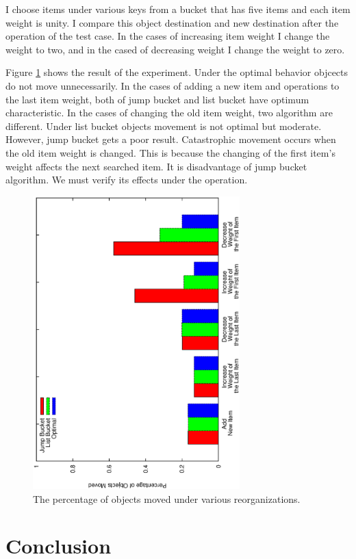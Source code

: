 \documentclass[a4paper,11pt]{article}
\begin{document}
I choose items under various keys from a bucket that has five items and each item weight is unity.
I compare this object destination and new destination after the operation of the test case. In the cases of increasing item weight I change the weight to two, and in the cased of decreasing weight I change the weight to zero.

Figure \ref{reorganize} shows the result of the experiment.
Under the optimal behavior objcects do not move unnecessarily.
In the cases of adding a new item and operations to the last item weight, both of jump bucket and list bucket have optimum characteristic.
In the cases of changing the old item weight, two algorithm are different. Under list bucket objects movement is not optimal but moderate.
However, jump bucket gets a poor result.
Catastrophic movement occurs when the old item weight is changed.
This is because the changing of the first item's weight affects the next searched item.
It is disadvantage of jump bucket algorithm.
We must verify its effects under the operation.

\begin{figure}[tbp]
  \begin{center}
    \includegraphics[width=80mm, angle=-90]{reorganize.eps}
  \end{center}
  \caption{The percentage of objects moved under various reorganizations.}
  \label{reorganize}
\end{figure}

\section{Conclusion}
\end{document}
